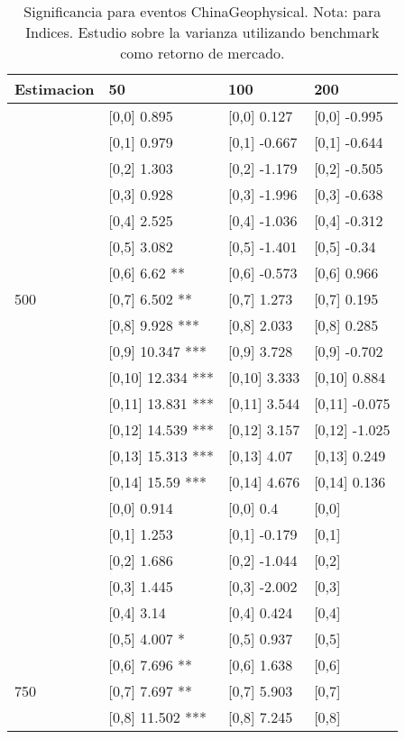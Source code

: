 \begin{table}

\caption{Significancia para eventos ChinaGeophysical. Nota: para Indices. Estudio sobre la varianza utilizando benchmark como retorno de mercado.}
\centering
\begin{tabular}[t]{llll}
\toprule
Estimacion & 50 & 100 & 200\\
\midrule
 & {}[0,0] 0.895 & {}[0,0] 0.127 & {}[0,0] -0.995\\
 & {}[0,1] 0.979 & {}[0,1] -0.667 & {}[0,1] -0.644\\
 & {}[0,2] 1.303 & {}[0,2] -1.179 & {}[0,2] -0.505\\
 & {}[0,3] 0.928 & {}[0,3] -1.996 & {}[0,3] -0.638\\
 & {}[0,4] 2.525 & {}[0,4] -1.036 & {}[0,4] -0.312\\
\addlinespace
 & {}[0,5] 3.082 & {}[0,5] -1.401 & {}[0,5] -0.34\\
 & {}[0,6] 6.62 ** & {}[0,6] -0.573 & {}[0,6] 0.966\\
500 & {}[0,7] 6.502 ** & {}[0,7] 1.273 & {}[0,7] 0.195\\
 & {}[0,8] 9.928 *** & {}[0,8] 2.033 & {}[0,8] 0.285\\
 & {}[0,9] 10.347 *** & {}[0,9] 3.728 & {}[0,9] -0.702\\
\addlinespace
 & {}[0,10] 12.334 *** & {}[0,10] 3.333 & {}[0,10] 0.884\\
 & {}[0,11] 13.831 *** & {}[0,11] 3.544 & {}[0,11] -0.075\\
 & {}[0,12] 14.539 *** & {}[0,12] 3.157 & {}[0,12] -1.025\\
 & {}[0,13] 15.313 *** & {}[0,13] 4.07 & {}[0,13] 0.249\\
 & {}[0,14] 15.59 *** & {}[0,14] 4.676 & {}[0,14] 0.136\\
\addlinespace
 & {}[0,0] 0.914 & {}[0,0] 0.4 & {}[0,0]\\
 & {}[0,1] 1.253 & {}[0,1] -0.179 & {}[0,1]\\
 & {}[0,2] 1.686 & {}[0,2] -1.044 & {}[0,2]\\
 & {}[0,3] 1.445 & {}[0,3] -2.002 & {}[0,3]\\
 & {}[0,4] 3.14 & {}[0,4] 0.424 & {}[0,4]\\
\addlinespace
 & {}[0,5] 4.007 * & {}[0,5] 0.937 & {}[0,5]\\
 & {}[0,6] 7.696 ** & {}[0,6] 1.638 & {}[0,6]\\
750 & {}[0,7] 7.697 ** & {}[0,7] 5.903 & {}[0,7]\\
 & {}[0,8] 11.502 *** & {}[0,8] 7.245 & {}[0,8]\\

\end{tabular}
\end{table}

